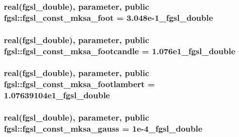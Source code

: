\subsubsection[{fgsl\+\_\+const\+\_\+mksa\+\_\+foot}]{\setlength{\rightskip}{0pt plus 5cm}real({\bf fgsl\+\_\+double}), parameter, public fgsl\+::fgsl\+\_\+const\+\_\+mksa\+\_\+foot = 3.\+048e-\/1\+\_\+fgsl\+\_\+double}\label{namespacefgsl_acff74ed42941dc6324409ba0eee894ee}
\hypertarget{namespacefgsl_aed42c585eae8fbc1ddd6baf9d539408f}{}
\subsubsection[{fgsl\+\_\+const\+\_\+mksa\+\_\+footcandle}]{\setlength{\rightskip}{0pt plus 5cm}real({\bf fgsl\+\_\+double}), parameter, public fgsl\+::fgsl\+\_\+const\+\_\+mksa\+\_\+footcandle = 1.\+076e1\+\_\+fgsl\+\_\+double}\label{namespacefgsl_aed42c585eae8fbc1ddd6baf9d539408f}
\hypertarget{namespacefgsl_a5362c5c67d790eba885afc839e76df4a}{}
\subsubsection[{fgsl\+\_\+const\+\_\+mksa\+\_\+footlambert}]{\setlength{\rightskip}{0pt plus 5cm}real({\bf fgsl\+\_\+double}), parameter, public fgsl\+::fgsl\+\_\+const\+\_\+mksa\+\_\+footlambert = 1.\+07639104e1\+\_\+fgsl\+\_\+double}\label{namespacefgsl_a5362c5c67d790eba885afc839e76df4a}
\hypertarget{namespacefgsl_a043539089f28355888955c6546349052}{}
\subsubsection[{fgsl\+\_\+const\+\_\+mksa\+\_\+gauss}]{\setlength{\rightskip}{0pt plus 5cm}real({\bf fgsl\+\_\+double}), parameter, public fgsl\+::fgsl\+\_\+const\+\_\+mksa\+\_\+gauss = 1e-\/4\+\_\+fgsl\+\_\+double}\label{namespacefgsl_a043539089f28355888955c6546349052}
\hypertarget{namespacefgsl_ac3e7e21c6fe9874df8a9b7583e343e76}{}
